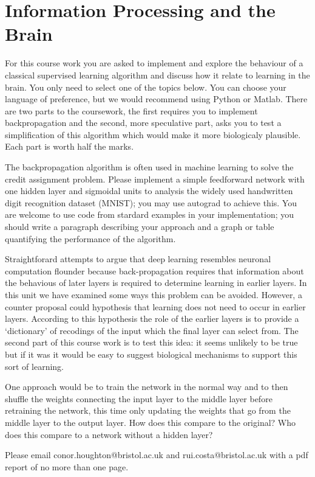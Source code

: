 \documentclass[12pt]{article}
\begin{document}
\section*{Information Processing and the Brain} 

For this course work you are asked to implement and explore the
behaviour of a classical supervised learning algorithm and discuss how
it relate to learning in the brain. You only need to select one of the
topics below​. You can choose your language of preference, but we would
recommend using Python or Matlab. There are two parts to the
coursework, the first requires you to implement backpropagation and
the second, more speculative part, asks you to test a simplification
of this algorithm which would make it more biologicaly plausible. Each
part is worth half the marks.

The backpropagation algorithm is often used in machine learning to
solve the credit assignment problem. Please implement a simple
feedforward network with one hidden layer and sigmoidal units to
analysis the widely used handwritten digit recognition dataset
(MNIST); you may use autograd to achieve this. You are welcome to use
code from stardard examples in your implementation; you should write a
paragraph describing your approach and a graph or table quantifying
the performance of the algorithm.

Straightforard attempts to argue that deep learning resembles neuronal
computation flounder because back-propagation requires that
information about the behavious of later layers is required to
determine learning in earlier layers. In this unit we have examined
some ways this problem can be avoided. However, a counter proposal
could hypothesis that learning does not need to occur in earlier
layers. According to this hypothesis the role of the earlier layers is
to provide a `dictionary' of recodings of the input which the final
layer can select from. The second part of this course work is to test
this idea: it seems unlikely to be true but if it was it would be easy
to suggest biological mechanisms to support this sort of learning.

One approach would be to train the network in the normal way and to
then shuffle the weights connecting the input layer to the middle
layer before retraining the network, this time only updating the
weights that go from the middle layer to the output layer. How does
this compare to the original? Who does this compare to a network
without a hidden layer?

Please email conor.houghton@bristol.ac.uk and rui.costa@bristol.ac.uk
with a pdf report of no more than one page.
\end{document}
